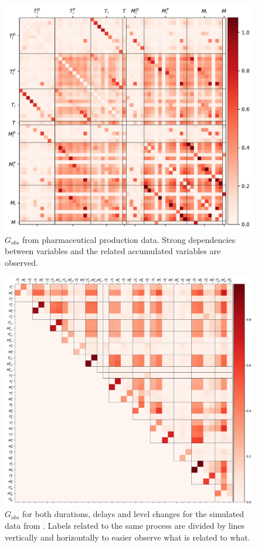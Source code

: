 \documentclass[../Thesis.tex]{subfiles}
\begin{document}
\begin{figure}[ht]
    \centering
    \includegraphics[width = 1\linewidth]{figures/Cycle data/G_obs complete - symmetric.pdf}
    \caption{$G_{obs}$ from pharmaceutical production data. Strong dependencies between variables and the related accumulated variables are observed.}
    \label{fig:Cycle data - G_obs all}
\end{figure}

\begin{figure}[ht]
    \centering
    \includegraphics[width = \linewidth]{figures/Cycle data/G_obs times and levelchanges - semi-directed.pdf}
    \caption{$G_{obs}$ for both durations, delays and level changes for the simulated data from \cite{benchmark-model-to-generate-batch-process-data}. Labels related to the same process are divided by lines vertically and horizontally to easier observe what is related to what.}
    \label{fig:G_obs times and levelchanges - semi-directed}
\end{figure}
\end{document}
